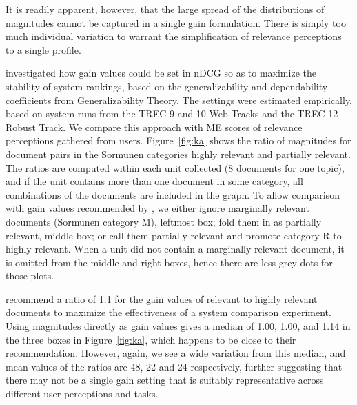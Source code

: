 It is readily apparent, however, that the large spread of the 
distributions of
magnitudes cannot be captured in a single gain formulation.
There is simply too much individual variation to warrant the
simplification of relevance perceptions to a single profile.

\citet{KanAsl03} investigated how gain values could be set in nDCG so
as to maximize the stability of system rankings, based on the
generalizability and dependability coefficients from Generalizability
Theory.
The settings were estimated empirically, based on system runs from the
TREC 9 and 10 Web Tracks and the TREC 12 Robust Track.
We compare this approach with ME scores of relevance perceptions
gathered from users.
Figure~\ref{fig:ka} shows the ratio of magnitudes for document pairs in
the Sormunen categories highly relevant and partially relevant.
The ratios are computed within each unit collected (8 documents for one
topic), and if the unit contains more than one document in some
category, all combinations of the documents are included in the graph.
To allow comparison with gain values recommended by 
\citet{KanAsl03}, we either ignore marginally 
relevant documents (Sormunen category M), leftmost box; fold them in as
partially relevant, middle box; or call them partially relevant and
promote category R to highly relevant.
When a unit did not contain a marginally relevant document, it is
omitted from the middle and right boxes, hence there are less grey dots
for those plots.

\citet{KanAsl03} recommend a ratio of 1.1 for the
gain values of relevant to highly relevant documents to maximize the
effectiveness of a system comparison experiment.
Using magnitudes directly as gain values gives a median of 1.00, 1.00,
and 1.14 in the three boxes in Figure~\ref{fig:ka}, which happens to be
close to their recommendation.
However, again, we see a wide variation from this median, and mean
values of the ratios are 48, 22 and 24 respectively, further suggesting
that there may not be a single gain setting that is suitably
representative across different user perceptions and tasks.

